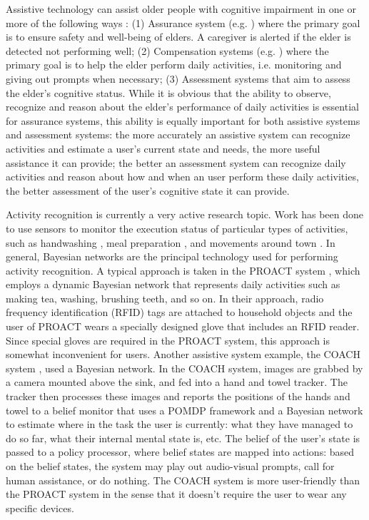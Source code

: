 Assistive technology can assist older people with cognitive impairment in one or more of the following ways \cite{pollack2005intelligent}: (1) Assurance system (e.g. \cite{hoey2012lacasa}) where the primary goal is to ensure safety and well-being of elders. A caregiver is alerted if the elder is detected not performing well; (2) Compensation systems (e.g. \cite{boger2005decision, peters2014automatic, hoey2010automated}) where the primary goal is to help the elder perform daily activities, i.e. monitoring and giving out prompts when necessary; (3) Assessment systems that aim to assess the elder's cognitive status. While it is obvious that the ability to observe, recognize and reason about the elder's performance of daily activities is essential for assurance systems, this ability is equally important for both assistive systems and assessment systems: the more accurately an assistive system can recognize activities and estimate a user's current state and needs, the more useful assistance it can provide; the better an assessment system can recognize daily activities and reason about how and when an user perform these daily activities, the better assessment of the user's cognitive state it can provide.

Activity recognition is currently a very active research topic. Work has been done to use sensors to monitor the execution status of particular types of activities, such as handwashing \cite{hoey2010automated}, meal preparation \cite{philipose2004inferring}, and movements around town \cite{hoey2012lacasa}. In general, Bayesian networks are the principal technology used for performing activity recognition. A typical approach is taken in the PROACT system \cite{philipose2004inferring}, which employs a dynamic Bayesian network that represents daily activities such as making tea, washing, brushing teeth, and so on. In their approach, radio frequency identification (RFID) tags are attached to household objects and the user of PROACT wears a specially designed glove that includes an RFID reader. Since special gloves are required in the PROACT system, this approach is somewhat inconvenient for users. Another assistive system example, the COACH system \cite{boger2005decision, hoey2010automated}, used a Bayesian network. In the COACH system, images are grabbed by a camera mounted above the sink, and fed into a hand and towel tracker. The tracker then processes these images and reports the positions of the hands and towel to a belief monitor that uses a POMDP framework and a Bayesian network to estimate where in the task the user is currently: what they have managed to do so far, what their internal mental state is, etc. The belief of the user's state is passed to a policy processor, where belief states are mapped into actions: based on the belief states, the system may play out audio-visual prompts, call for human assistance, or do nothing. The COACH system is more user-friendly than the PROACT system in the sense that it doesn't require the user to wear any specific devices.


